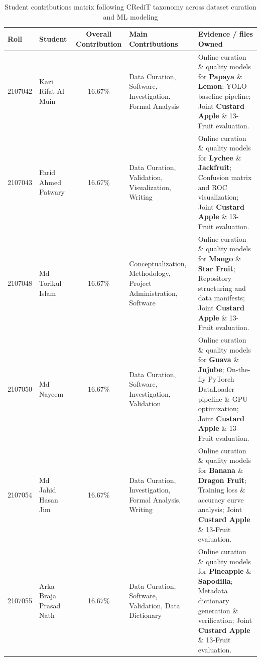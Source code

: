 \documentclass[11pt,a4paper]{article}
\begin{document}
\vspace{0.5em}

\begin{table}[H]
\centering\small
\begin{tabularx}{\textwidth}{|l|p{3.4cm}|c|p{3.6cm}|X|}
\hline
\textbf{Roll} & \textbf{Student} & \textbf{Overall Contribution} & \textbf{Main Contributions} & \textbf{Evidence / files Owned} \\
\hline
2107042 & Kazi Rifat Al Muin & 16.67\% & Data Curation, Software, Investigation, Formal Analysis & Online curation \& quality models for \textbf{Papaya} \& \textbf{Lemon}; YOLO baseline pipeline; Joint \textbf{Custard Apple} \& 13-Fruit evaluation. \\ \hline
2107043 & Farid Ahmed Patwary & 16.67\% & Data Curation, Validation, Visualization, Writing & Online curation \& quality models for \textbf{Lychee} \& \textbf{Jackfruit}; Confusion matrix and ROC visualization; Joint \textbf{Custard Apple} \& 13-Fruit evaluation. \\ \hline
2107048 & Md Torikul Islam & 16.67\% & Conceptualization, Methodology, Project Administration, Software & Online curation \& quality models for \textbf{Mango} \& \textbf{Star Fruit}; Repository structuring and data manifests; Joint \textbf{Custard Apple} \& 13-Fruit evaluation. \\ \hline
2107050 & Md Nayeem & 16.67\% & Data Curation, Software, Investigation, Validation & Online curation \& quality models for \textbf{Guava} \& \textbf{Jujube}; On-the-fly PyTorch DataLoader pipeline \& GPU optimization; Joint \textbf{Custard Apple} \& 13-Fruit evaluation. \\ \hline
2107054 & Md Jahid Hasan Jim & 16.67\% & Data Curation, Investigation, Formal Analysis, Writing & Online curation \& quality models for \textbf{Banana} \& \textbf{Dragon Fruit}; Training loss \& accuracy curve analysis; Joint \textbf{Custard Apple} \& 13-Fruit evaluation. \\ \hline
2107055 & Arka Braja Prasad Nath & 16.67\% & Data Curation, Software, Validation, Data Dictionary & Online curation \& quality models for \textbf{Pineapple} \& \textbf{Sapodilla}; Metadata dictionary generation \& verification; Joint \textbf{Custard Apple} \& 13-Fruit evaluation. \\ \hline
\end{tabularx}
\caption{Student contributions matrix following CRediT taxonomy across dataset curation and ML modeling}
\label{tab:student-contributions}
\end{table}
\end{document}
